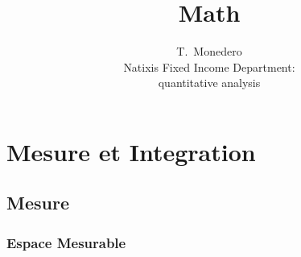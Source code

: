 \documentclass[3pt]{article}
\begin{document}
\title{Math}
\author{T.\ Monedero \\
Natixis Fixed Income Department:\\
quantitative analysis }
\maketitle

\begin{abstract}
\end{abstract}

\tableofcontents

\bigskip

\bigskip

\bigskip

\bigskip

\bigskip

\bigskip

\bigskip

\bigskip

\bigskip

\bigskip

\bigskip

\bigskip

\bigskip

\bigskip

\bigskip

\bigskip

\bigskip

\bigskip

\section{Mesure et Integration}

\bigskip

\subsection{Mesure}

\subsubsection{Espace Mesurable}

\bigskip
\end{document}

